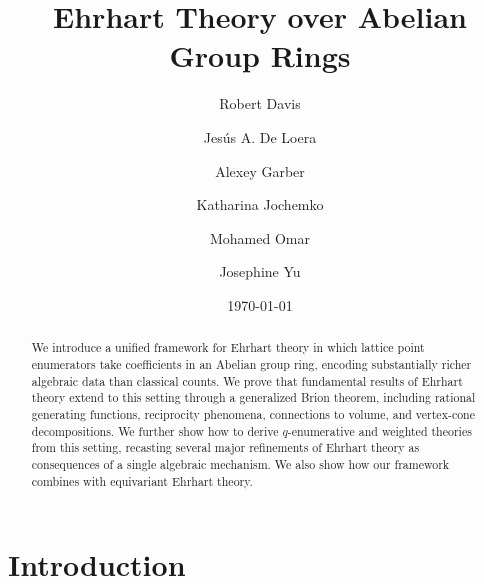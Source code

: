 \documentclass[12pt,reqno]{amsart}
\theoremstyle{definition}
\theoremstyle{remark}
\begin{document}
\title{Ehrhart Theory over Abelian Group Rings} 

\author[R. Davis]{Robert Davis}
\address{
	Colgate University \\
	Hamilton, NY, USA }

\author[J. A. De Loera]{Jes\'us A. De Loera}
\address{University of California, Davis, CA, USA}

\author[A. Garber]{Alexey Garber}
\address{
University of Texas Rio Grande Valley, 
Brownsville, TX, USA}

\author[K. Jochemko]{Katharina Jochemko}
\address{KTH Royal Institute of Technology, Stockholm, Sweden}

\author[M. Omar]{Mohamed Omar}
\address{York University, Toronto, Canada}

\author[J. Yu]{Josephine Yu}
\address{Georgia Institute of Technology, Atlanta, GA, USA}


\date{\today}

\begin{abstract} 
We introduce a unified framework for Ehrhart theory in which lattice point enumerators take coefficients in an Abelian group ring, encoding substantially richer algebraic data than classical counts.  We prove that fundamental results of Ehrhart theory extend to this setting through a generalized Brion theorem, including rational generating functions, reciprocity phenomena, connections to volume, and vertex-cone decompositions. 
We further show how to derive $q$-enumerative and weighted theories from this setting, recasting several major refinements of Ehrhart theory as consequences of a single algebraic mechanism. We also show how our framework combines with equivariant Ehrhart theory. 
\end{abstract}
\maketitle


\section{Introduction}
\end{document}
